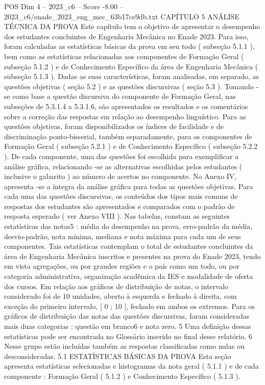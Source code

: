 \begin{textsample}{POS Dim 4 – 2023\_c6 – Score -8.00 – 2023\_c6/enade\_2023\_eng\_mec\_63b17ce9db.txt}  \label{ex:f4_pos_348}
CAPÍTULO 5 ANÁLISE TÉCNICA DA PROVA Este capítulo tem o objetivo de apresentar o desempenho dos estudantes concluintes de Engenharia Mecânica no Enade 2023.
Para isso, foram calculadas as estatísticas básicas da prova em seu todo ( subseção 5.1.1 ), bem como as estatísticas relacionadas aos componentes de Formação Geral ( subseção 5.1.2 ) e de Conhecimento Específico da área de Engenharia Mecânica ( subseção 5.1.3 ).
Dadas as suas características, foram analisadas, em separado, as questões objetivas ( seção 5.2 ) e as questões discursivas ( seção 5.3 ).
Tomando -se como base a questão discursiva do componente de Formação Geral, nas subseções de 5.3.1.4 a 5.3.1.6, são apresentados os resultados e os comentários sobre a correção das respostas em relação ao desempenho linguístico.
Para as questões objetivas, foram disponibilizados os índices de facilidade e de discriminação ponto-bisserial, também separadamente, para os componentes de Formação Geral ( subseção 5.2.1 ) e de Conhecimento Específico ( subseção 5.2.2 ).
De cada componente, uma das questões foi escolhida para exemplificar a análise gráfica, relacionando -se as alternativas escolhidas pelos estudantes ( inclusive o gabarito ) ao número de acertos no componente.
No Anexo IV, apresenta -se a íntegra da análise gráfica para todas as questões objetivas.
Para cada uma das questões discursivas, os conteúdos dos tipos mais comuns de respostas dos estudantes são apresentados e comparados com o padrão de resposta esperado ( ver Anexo VIII ).
Nas tabelas, constam as seguintes estatísticas das notas5 : média do desempenho na prova, erro-padrão da média, desvio-padrão, nota mínima, mediana e nota máxima para cada um de seus componentes.
Tais estatísticas contemplam o total de estudantes concluintes da área de Engenharia Mecânica inscritos e presentes na prova do Enade 2023, tendo em vista agregações, ou por grandes regiões e o país como um todo, ou por categoria administrativa, organização acadêmica da IES e modalidade de oferta dos cursos.
Em relação aos gráficos de distribuição de notas, o intervalo considerado foi de 10 unidades, aberto à esquerda e fechado à direita, com exceção do primeiro intervalo, [ 0 ; 10 ], fechado em ambos os extremos.
Para os gráficos de distribuição das notas das questões discursivas, foram consideradas mais duas categorias : questão em branco6 e nota zero. 5 Uma definição dessas estatísticas pode ser encontrada no Glossário inserido no final desse relatório. 6 Nesse grupo estão incluídas também as respostas classificadas como nulas ou desconsideradas. 5.1 ESTATÍSTICAS BÁSICAS DA PROVA Esta seção apresenta estatísticas selecionadas e histogramas da nota geral ( 5.1.1 ) e de cada componente : Formação Geral ( 5.1.2 ) e Conhecimento Específico ( 5.1.3 ).

\end{textsample}
